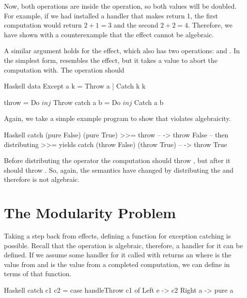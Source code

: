 Now, both  operations are inside the  operation, so both values will be doubled. For example, if we had installed a handler that makes  return 1, the first computation would return $2 + 1 = 3$ and the second $2 + 2 = 4$. Therefore, we have shown with a counterexample that the  effect cannot be algebraic.

A similar argument holds for the  effect, which also has two operations:  and . In the simplest form,  resembles the  effect, but it takes a value to abort the computation with. The  operation should 

\begin{lst}{Haskell}
data Except a k = Throw a | Catch k k

throw     = Do $ inj $ Throw
catch a b = Do $ inj $ Catch a b
\end{lst}

Again, we take a simple example program to show that  violates algebraicity.

\begin{lst}{Haskell}
catch (pure False)  (pure True)  >>= throw -- -> throw False
-- then distributing >>= yields
catch (throw False) (throw True)           -- -> throw True
\end{lst}

Before distributing the \hs{>>=} operator the computation should throw , but after it should throw . So, again, the semantics have changed by distributing the \hs{>>=} and therefore  is not algebraic.

\section{The Modularity Problem}

Taking a step back from effects, defining a function for exception catching is possible. Recall that the  operation is algebraic, therefore, a handler for it can be defined. If we assume some handler for it called  with returns an  where  is the value from  and  is the value from a completed computation, we can define  in terms of that function.

\begin{lst}{Haskell}
catch c1 c2 =
  case handleThrow c1 of
    Left e -> c2
    Right a -> pure a
\end{lst}

